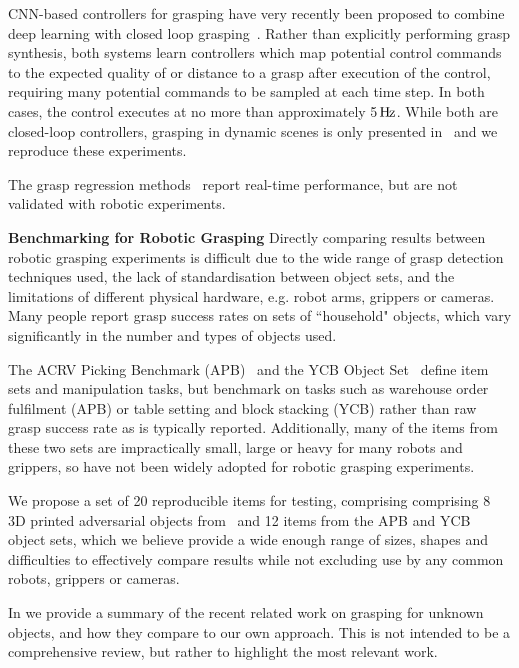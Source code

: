 \documentclass[conference]{IEEEtran}
\newcommand{\pack}	{\hspace{-0.08em}}
\newcommand{\Hz}	{\ensuremath{\rm\,H\pack z}}
\begin{document}
CNN-based controllers for grasping have very recently been proposed to combine deep learning with closed loop grasping~\cite{Levine2017LearningCollection, Viereck2017LearningImages}.  Rather than explicitly performing grasp synthesis, both systems learn controllers which map potential control commands to the expected quality of or distance to a grasp after execution of the control, requiring many potential commands to be sampled at each time step.  In both cases, the control executes at no more than approximately 5\Hz. While both are closed-loop controllers, grasping in dynamic scenes is only presented in~\cite{Viereck2017LearningImages} and we reproduce these experiments. 

The grasp regression methods~\cite{Kumra2017RoboticNetworks, Redmon2015Real-timeNetworks} report real-time performance, but are not validated with robotic experiments.

\textbf{Benchmarking for Robotic Grasping}
Directly comparing results between robotic grasping experiments is difficult due to the wide range of grasp detection techniques used, the lack of standardisation between object sets, and the limitations of different physical hardware, e.g. robot arms, grippers or cameras.  Many people report grasp success rates on sets of ``household" objects, which vary significantly in the number and types of objects used.

The ACRV Picking Benchmark (APB)~\cite{leitner2017acrvpicking} and the YCB Object Set~\cite{calli2017ycb} define item sets and manipulation tasks, but benchmark on tasks such as warehouse order fulfilment (APB) or table setting and block stacking (YCB) rather than raw grasp success rate as is typically reported.  Additionally, many of the items from these two sets are impractically small, large or heavy for many robots and grippers, so have not been widely adopted for robotic grasping experiments.

We propose a set of 20 reproducible items for testing, comprising comprising 8 3D printed adversarial objects from~\cite{Mahler2017Dex2} and 12 items from the APB and YCB object sets, which we believe provide a wide enough range of sizes, shapes and difficulties to effectively compare results while not excluding use by any common robots, grippers or cameras.

In  we provide a summary of the recent related work on grasping for unknown objects, and how they compare to our own approach.  This is not intended to be a comprehensive review, but rather to highlight the most relevant work. 
\end{document}
